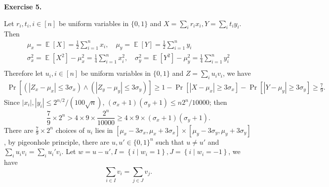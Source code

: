 \documentclass[a4paper]{article}
\newenvironment{exercise}[1]{
	\par
	\noindent\textbf{Exercise #1.}\quad
}{
	\par
	\bigskip
}
\DeclareMathOperator{\E}{\mathbb E}
\newcommand{\abs}[1]{\left| #1 \right|}
\newcommand{\pbra}[1]{\left( #1 \right)}
\newcommand{\cbra}[1]{\left\{ #1 \right\}}
\newcommand{\sbra}[1]{\left[ #1 \right]}
\newcommand{\bin}{\{0,1\}}
\begin{document}
\begin{exercise}{5}
    Let $r_i,t_i,i\in[n]$ be uniform variables in $\bin$ and $X=\sum_ir_ix_i,Y=\sum_it_iy_i$. Then
    \begin{gather*}
        \mu_x=\E\sbra{X}=\frac12\sum_{i=1}^nx_i,\quad \mu_y=\E\sbra{Y}=\frac12\sum_{i=1}^ny_i\\
        \sigma_x^2=\E\sbra{X^2}-\mu_x^2=\frac14\sum_{i=1}^nx_i^2,\quad \sigma_y^2=\E\sbra{Y^2}-\mu_y^2=\frac14\sum_{i=1}^ny_i^2\\
    \end{gather*}
    Therefore let $u_i,i\in[n]$ be uniform variables in $\bin$ and $Z=\sum_iu_iv_i$, we have 
    \begin{align*}
        \Pr\sbra{\pbra{\abs{Z_x-\mu_x}\leq3\sigma_x}\land\pbra{\abs{Z_y-\mu_y}\leq3\sigma_y}}
        \geq1-\Pr\sbra{\abs{X-\mu_x}\geq3\sigma_x}-\Pr\sbra{\abs{Y-\mu_y}\geq3\sigma_y}
        \geq\frac79.
    \end{align*}
    Since $\abs{x_i},\abs{y_i}\leq2^{n/2}/(100\sqrt n)$, $(\sigma_x+1)(\sigma_y+1)\leq n2^n/10000$; then 
    $$
    \frac79\times2^n>4\times9\times\frac{2^n}{10000}\geq4\times9\times(\sigma_x+1)(\sigma_y+1).
    $$
    There are $\frac79\times2^n$ choices of $u_i$ lies in 
    $[\mu_x-3\sigma_x,\mu_x+3\sigma_x]\times[\mu_y-3\sigma_y,\mu_y+3\sigma_y]$, by pigeonhole principle,
    there are $u,u'\in\bin^n$ such that $u\neq u'$ and $\sum_iu_iv_i=\sum_iu_i'v_i$. Let $w=u-u',I=\cbra{i\middle|w_i=1},
    J=\cbra{i\middle|w_i=-1}$, we have
    $$
    \sum_{i\in I}v_i=\sum_{j\in J}v_j.
    $$
\end{exercise}
\end{document}
